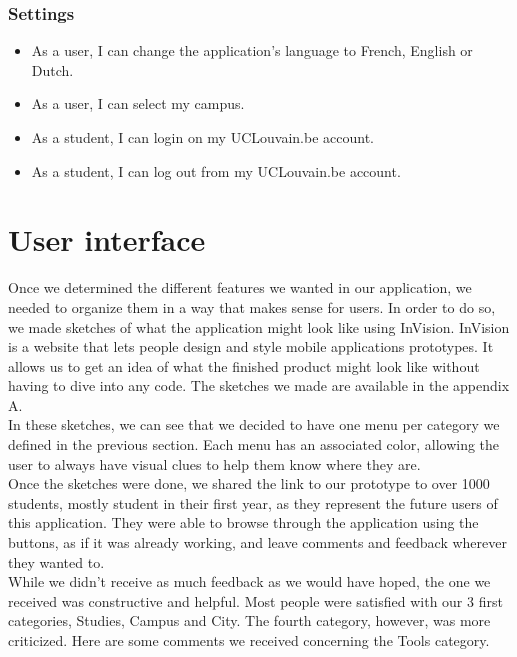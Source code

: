 \documentclass{eplmastersthesis}
\begin{document}
\subsubsection{Settings}

\begin{itemize}
\item As a user, I can change the application's language to French, English or Dutch.
\item As a user, I can select my campus.
\item As a student, I can login on my UCLouvain.be account.
\item As a student, I can log out from my UCLouvain.be account. 
\end{itemize}

\section{User interface}

Once we determined the different features we wanted in our application, we needed to organize them in a way that makes sense for users. In order to do so, we made sketches of what the application might look like using InVision. InVision is a website that lets people design and style mobile applications prototypes. It allows us to get an idea of what the finished product might look like without having to dive into any code. The sketches we made are available in the appendix A.\\

In these sketches, we can see that we decided to have one menu per category we defined in the previous section. Each menu has an associated color, allowing the user to always have visual clues to help them know where they are.\\

Once the sketches were done, we shared the link to our prototype to over 1000 students, mostly student in their first year, as they represent the future users of this application. They were able to browse through the application using the buttons, as if it was already working, and leave comments and feedback wherever they wanted to.\\

While we didn't receive as much feedback as we would have hoped, the one we received was constructive and helpful. Most people were satisfied with our 3 first categories, Studies, Campus and City. The fourth category, however, was more criticized. Here are some comments we received concerning the Tools category.\\
\end{document}
